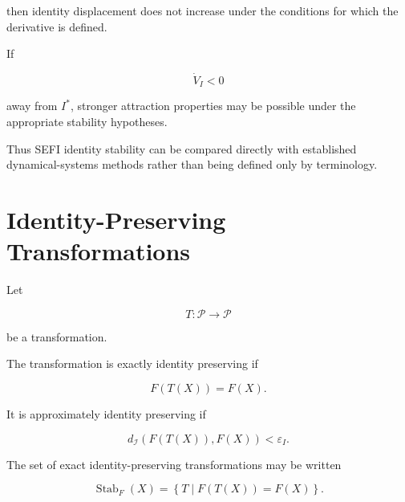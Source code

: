 \documentclass[12pt,oneside]{book}
\begin{document}
then identity displacement does not increase under the
conditions for which the derivative is defined.

If

\begin{equation}
    \dot{V}_I
    <
    0
\end{equation}

away from \(I^\ast\), stronger attraction properties may be
possible under the appropriate stability hypotheses.

Thus SEFI identity stability can be compared directly with
established dynamical-systems methods rather than being defined
only by terminology.


\section{Identity-Preserving Transformations}
\label{sec:chapter-four-identity-transformations}

Let

\begin{equation}
    T:
    \mathcal{P}
    \rightarrow
    \mathcal{P}
\end{equation}

be a transformation.

The transformation is exactly identity preserving if

\begin{equation}
    F(T(X))
    =
    F(X).
    \label{eq:chapter-four-exact-invariance}
\end{equation}

It is approximately identity preserving if

\begin{equation}
    d_{\mathcal{I}}
    \left(
        F(T(X)),
        F(X)
    \right)
    <
    \varepsilon_I.
    \label{eq:approximate-transformation-invariance}
\end{equation}

The set of exact identity-preserving transformations may be
written

\begin{equation}
    \operatorname{Stab}_F(X)
    =
    \left\{
        T
        \mid
        F(T(X))=F(X)
    \right\}.
    \label{eq:identity-stabilizer}
\end{equation}
\end{document}
